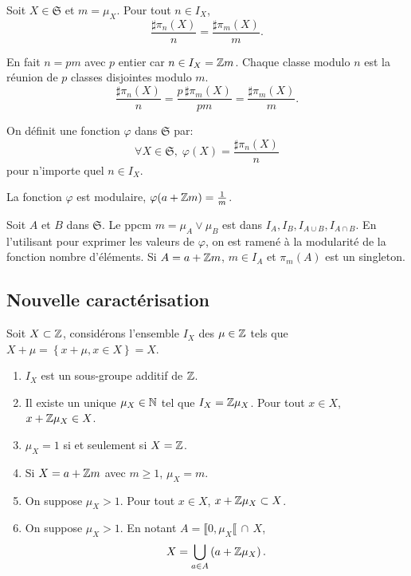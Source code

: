 \begin{lem}
  Soit $X\in \mathfrak{S}$ et $m=\mu_X$. Pour tout $n\in I_X$,
  \begin{displaymath}
      \frac{\sharp \pi_n(X)}{n} = \frac{\sharp \pi_m(X)}{m}.
  \end{displaymath}
\end{lem}
\begin{demo}
  En fait $n = pm$ avec $p$ entier car $n \in I_X = \mathbb{Z} m$. Chaque classe modulo $n$ est la réunion de $p$ classes disjointes modulo $m$.
  \begin{displaymath}
    \frac{\sharp \pi_n(X)}{n} = \frac{p \, \sharp \pi_m(X)}{ p m} = \frac{\sharp \pi_m(X)}{m}.
  \end{displaymath}
\end{demo}
\begin{defi}\label{defPhi}
  On définit une fonction $\varphi$ dans $\mathfrak{S}$ par:
  \begin{displaymath}
    \forall X \in \mathfrak{S}, \; \varphi(X) = \frac{\sharp \pi_n(X)}{n}
  \end{displaymath}
pour n'importe quel $n\in I_X$.
\end{defi}
\begin{prop}
  La fonction $\varphi$ est modulaire, $\varphi(a + \mathbb{Z} m) = \frac{1}{m}$.
\end{prop}
\begin{demo}
  Soit $A$ et $B$ dans $\mathfrak{S}$. Le ppcm $m = \mu_A \vee \mu_B$ est dans $I_A, I_B, I_{A\cup B}, I_{A\cap B}$. En l'utilisant pour exprimer les valeurs de $\varphi$, on est ramené à la modularité de la fonction nombre d'éléments.\newline
  Si $A= a + \mathbb{Z} m$, $m \in I_A$ et $\pi_m(A)$ est un singleton.
\end{demo}

\subsection{Nouvelle caractérisation}
Soit $X \subset \mathbb{Z}$, considérons l'ensemble $I_X$ des $\mu \in \mathbb{Z}$ tels que $X + \mu =\left\lbrace x + \mu , x\in X\right\rbrace = X$.
\begin{rems}
  \begin{enumerate}
    \item $I_X$ est un sous-groupe additif de $\mathbb{Z}$.
    \item Il existe un unique $\mu_X \in \mathbb{N}$ tel que $I_X = \mathbb{Z} \mu_X$. Pour tout $x\in X$, $x + \mathbb{Z} \mu_X \in X$.
    \item $\mu_X = 1$ si et seulement si $X=\mathbb{Z}$.
    \item Si $X = a + \mathbb{Z} m$ avec $m \geq 1$, $\mu_X = m$.
    \item On suppose $\mu_X > 1$. Pour tout $x \in X$, $x + \mathbb{Z} \mu_X \subset X$.
    \item On suppose $\mu_X > 1$. En notant $A  = \llbracket 0 , \mu_X \llbracket \, \cap \, X$,
\begin{displaymath}
  X = \bigcup_{a \in A}\left(a + \mathbb{Z} \mu_X\right).
\end{displaymath}
  \end{enumerate}
\end{rems}

